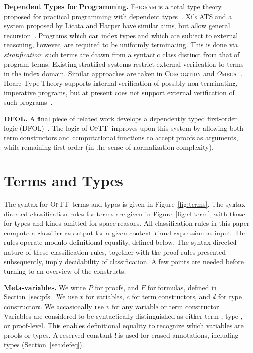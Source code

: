 \documentclass[preprint,natbib]{sigplanconf}
\newcommand{\optt}{\textsc{OpTT}}
\newcommand{\bang}[0]{\texttt{!}}
\begin{document}
\textbf{Dependent Types for Programming.} \textsc{Epigram} is a total
type theory proposed for practical programming with dependent
types~\cite{mcbride+04}.  Xi's \textsc{ATS} and a system proposed by
Licata and Harper have similar aims, but allow general
recursion~\cite{licata+05,chenxi05}.  Programs which can index types
and which are subject to external reasoning, however, are required to
be uniformly terminating.  This is done via \emph{stratification}:
such terms are drawn from a syntactic class distinct from that of
program terms.  Existing stratified systems restrict external
verification to terms in the index domain.  Similar approaches are
taken in \textsc{Concoqtion} and
$\Omega$\textsc{mega}~\cite{pasalic+07,sheard06}.  Hoare Type Theory
supports internal verification of possibly non-terminating, imperative
programs, but at present does not support external verification of
such programs~\cite{nanevski+05}.

\textbf{DFOL.} A final piece of related work develops a dependently
typed first-order logic (DFOL)~\cite{rabe06}.  The logic of \optt\
improves upon this system by allowing both term constructors and
computational functions to accept proofs as arguments, while remaining
first-order (in the sense of normalization complexity).

\section{Terms and Types}
\label{sec:terms}

The syntax for \optt\ terms and types is given in
Figure~\ref{fig:terms}.  The syntax-directed classification rules for
terms are given in Figure~\ref{fig:cl-term}, with those for types and
kinds omitted for space reasons.  All classification rules in this
paper compute a classifier as output for a given context $\Gamma$ and
expression as input.  The rules operate modulo definitional equality,
defined below.  The syntax-directed nature of these classification
rules, together with the proof rules presented subsequently, imply
decidability of classification.  A few points are needed before
turning to an overview of the constructs.

\textbf{Meta-variables.} We write $P$ for
proofs, and $F$ for formulas, defined in Section~\ref{sec:pfs}.  We
use $x$ for variables, $c$ for term constructors, and $d$ for type
constructors.  We occasionally use $v$ for any variable or term
constructor.  Variables are considered to be syntactically
distinguished as either term-, type-, or proof-level.  This enables
definitional equality to recognize which variables are proofs or
types.  A reserved constant $\bang$ is used for erased annotations,
including types (Section~\ref{sec:defeq}).  
\end{document}
